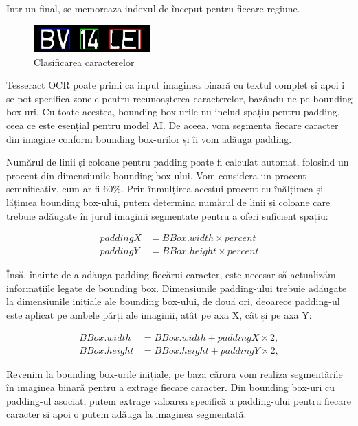 \documentclass[a4paper,12pt]{report}
\begin{document}
Intr-un final, se memoreaza indexul de început pentru fiecare regiune.

\begin{figure}[h!]
    \centering
    \includegraphics[width=0.4\textwidth]{images/partitioned.jpg}
    \caption{Clasificarea caracterelor}
\end{figure}
\FloatBarrier

Tesseract OCR poate primi ca input imaginea binară cu textul complet și apoi i se pot specifica zonele pentru recunoașterea caracterelor, bazându-ne pe bounding box-uri. Cu toate acestea, bounding box-urile nu includ spațiu pentru padding, ceea ce este esențial pentru model AI. De aceea, vom segmenta fiecare caracter din imagine conform bounding box-urilor și îi vom adăuga padding.

Numărul de linii și coloane pentru padding poate fi calculat automat, folosind un procent din dimensiunile bounding box-ului. Vom considera un procent semnificativ, cum ar fi 60\%. Prin înmulțirea acestui procent cu înălțimea și lățimea bounding box-ului, putem determina numărul de linii și coloane care trebuie adăugate în jurul imaginii segmentate pentru a oferi suficient spațiu:

\[
    \begin{aligned}
        paddingX & = BBox.width \times percent  \\
        paddingY & = BBox.height \times percent
    \end{aligned}
\]

Însă, înainte de a adăuga padding fiecărui caracter, este necesar să actualizăm informațiile legate de bounding box. Dimensiunile padding-ului trebuie adăugate la dimensiunile inițiale ale bounding box-ului, de două ori, deoarece padding-ul este aplicat pe ambele părți ale imaginii, atât pe axa X, cât și pe axa Y:

\[
    \begin{aligned}
        BBox.width  & = BBox.width + paddingX \times 2,  \\
        BBox.height & = BBox.height + paddingY \times 2,
    \end{aligned}
\]

Revenim la bounding box-urile inițiale, pe baza cărora vom realiza segmentările în imaginea binară pentru a extrage fiecare caracter. Din bounding box-uri cu padding-ul asociat, putem extrage valoarea specifică a padding-ului pentru fiecare caracter și apoi o putem adăuga la imaginea segmentată.
\end{document}
